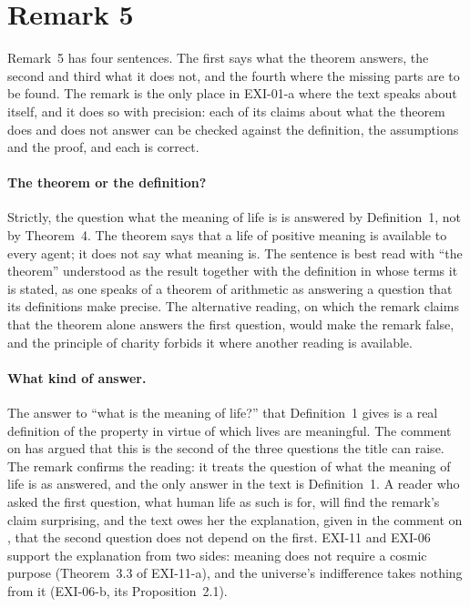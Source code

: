 \section{Remark 5}\label{s:remark}

Remark~5 has four sentences. The first says what the theorem answers, the second and third what it does not, and the fourth where the missing parts are to be found. The remark is the only place in EXI-01-a where the text speaks about itself, and it does so with precision: each of its claims about what the theorem does and does not answer can be checked against the definition, the assumptions and the proof, and each is correct.



\paragraph{The theorem or the definition?} Strictly, the question what the meaning of life is is answered by Definition~1, not by Theorem~4. The theorem says that a life of positive meaning is available to every agent; it does not say what meaning is. The sentence is best read with \enquote{the theorem} understood as the result together with the definition in whose terms it is stated, as one speaks of a theorem of arithmetic as answering a question that its definitions make precise. The alternative reading, on which the remark claims that the theorem alone answers the first question, would make the remark false, and the principle of charity forbids it where another reading is available.

\paragraph{What kind of answer.} The answer to \enquote{what is the meaning of life?} that Definition~1 gives is a real definition of the property in virtue of which lives are meaningful. The comment on  has argued that this is the second of the three questions the title can raise. The remark confirms the reading: it treats the question of what the meaning of life is as answered, and the only answer in the text is Definition~1. A reader who asked the first question, what human life as such is for, will find the remark's claim surprising, and the text owes her the explanation, given in the comment on , that the second question does not depend on the first. EXI-11 and EXI-06 support the explanation from two sides: meaning does not require a cosmic purpose (Theorem~3.3 of EXI-11-a), and the universe's indifference takes nothing from it (EXI-06-b, its Proposition~2.1).

